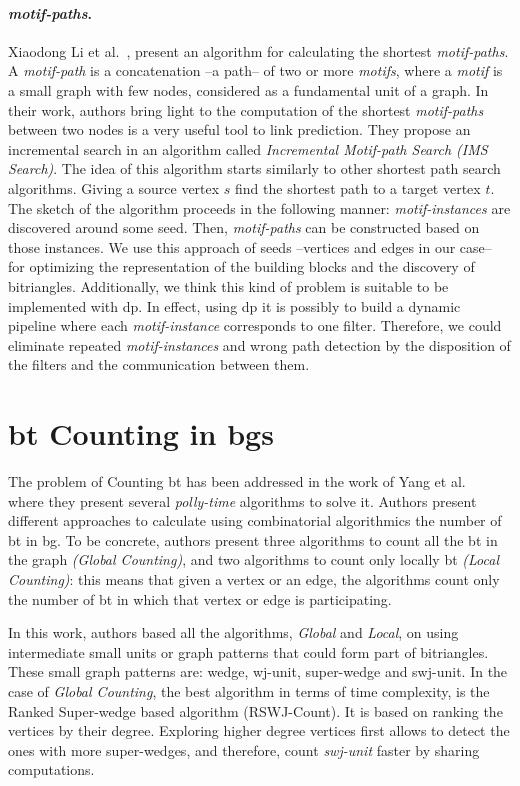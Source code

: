 \paragraph{\emph{motif-paths}.} Xiaodong Li et al.~\cite{Li2019MotifPA}, present an algorithm for calculating the shortest \emph{motif-paths}.
A \emph{motif-path} is a concatenation --a path--  of two or more \emph{motifs}, where a \emph{motif} is a small graph with few nodes, considered as a fundamental unit of a graph.
In their work, authors bring light to the computation of the shortest \emph{motif-paths} between two nodes is a very useful tool to link prediction. They propose an incremental search in an algorithm called \emph{Incremental Motif-path Search (IMS Search)}.
The idea of this algorithm starts similarly to other shortest path search algorithms. Giving a source vertex $s$ find the shortest path to a target vertex $t$.
The sketch of the algorithm proceeds in the following manner: \emph{motif-instances} are discovered around some seed. Then, \emph{motif-paths} can be constructed based on those instances. 
We use this approach of seeds --vertices and edges in our case-- for optimizing the representation of the building blocks and the discovery of bitriangles. 
Additionally, we think this kind of problem is suitable to be implemented with \acrlong{dp}. 
In effect, using \acrshort{dp} it is possibly to  build a dynamic pipeline where each \emph{motif-instance} corresponds to one filter. 
Therefore, we could eliminate repeated \emph{motif-instances} and wrong path detection by the disposition of the filters and the communication between them.

\section{\acrlong{bt} Counting in \acrlong{bg}s}\label{sec:rel-work:counting}
The problem of Counting \acrshort{bt} has been addressed in the work of Yang et al.~\cite{btcount} where they present several \emph{polly-time} algorithms to solve it.
Authors present different approaches to calculate using  combinatorial algorithmics the number of \acrshort{bt} in \acrshort{bg}. 
To be concrete, authors present three algorithms to count all the \acrshort{bt} in the graph \emph{(Global Counting)}, and two algorithms to count only locally \acrshort{bt} \emph{(Local Counting)}: this means that given a vertex or an edge, the algorithms count only the number of \acrshort{bt} in which 
that vertex or edge is participating.

In this work, authors based all the algorithms, \emph{Global} and \emph{Local}, on using intermediate small units or graph patterns that could form part of  bitriangles. These small graph patterns are: wedge, wj-unit, super-wedge and swj-unit.
In the case of \emph{Global Counting}, the best algorithm in terms of time complexity, is the Ranked Super-wedge based algorithm (RSWJ-Count). 
It is based on ranking the vertices by their degree. Exploring higher degree vertices first allows to detect the ones with more super-wedges, and therefore, count \emph{swj-unit} faster by sharing computations. 

